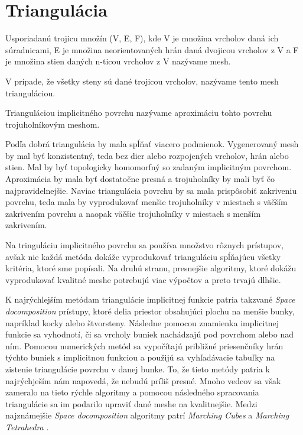 \section{Triangulácia}

Usporiadanú trojicu množín (V, E, F), kde V je množina vrcholov daná ich súradnicami, E je množina neorientovaných hrán daná 
dvojicou vrcholov z V a F je množina stien daných n-ticou vrcholov z V nazývame mesh.

V prípade, že všetky steny sú dané trojicou vrcholov, nazývame tento mesh trianguláciou.

Trianguláciou implicitného povrchu nazývame aproximáciu tohto povrchu trojuholníkovým meshom.

Podľa \cite{akkouche2001adaptive}
dobrá triangulácia by mala spĺňať viacero podmienok. Vygenerovaný mesh by mal byť konzistentný, 
teda bez dier alebo rozpojených vrcholov, hrán alebo stien. Mal by byť topologicky homomorfný 
so zadaným implicitným povrchom. Aproximácia by mala byť dostatočne presná a trojuholníky by mali 
byť čo najpravidelnejšie. Naviac triangulácia povrchu by sa mala prispôsobiť zakriveniu povrchu,
teda mala by vyprodukovať menšie trojuholníky v miestach s väčším zakrivením povrchu a naopak väčšie
trojuholníky v miestach s menším zakrivením.

Na tringuláciu implicitného povrchu sa používa množstvo rôznych prístupov, avšak nie každá metóda
dokáže vyprodukovať trianguláciu spĺňajúcu všetky kritéria, ktoré sme popísali. Na druhú stranu, 
presnejšie algoritmy, ktoré dokážu vyprodukovať kvalitné meshe potrebujú viac výpočtov a preto
trvajú dlhšie. 

K najrýchlejším metódam triangulácie implicitnej funkcie patria takzvané \textit{Space docomposition}
prístupy, ktoré delia priestor obsahujúci plochu na menšie bunky, napríklad kocky alebo štvorsteny.
Následne pomocou znamienka implicitnej funkcie sa vyhodnotí, či sa vrcholy buniek nachádzajú pod povrchom 
alebo nad ním. Pomocou numerických metód sa vypočítajú približné priesenčníky hrán týchto buniek s 
implicitnou funkciou a použijú sa vyhľadávacie tabuľky na zistenie triangulácie povrchu v danej bunke. 
To, že tieto metódy patria k najrýchješím nám napovedá, že nebudú príliš presné. Mnoho vedcov sa
však zameralo na tieto rýchle algoritmy a pomocou následného spracovania triangulácie sa im 
podarilo upraviť dané meshe na kvalitnejšie. Medzi najznámejšie \textit{Space docomposition} algoritmy
patrí \textit{Marching Cubes} \cite{lorensen1987marching} a \textit{Marching Tetrahedra} \cite{doi1991efficient}.

